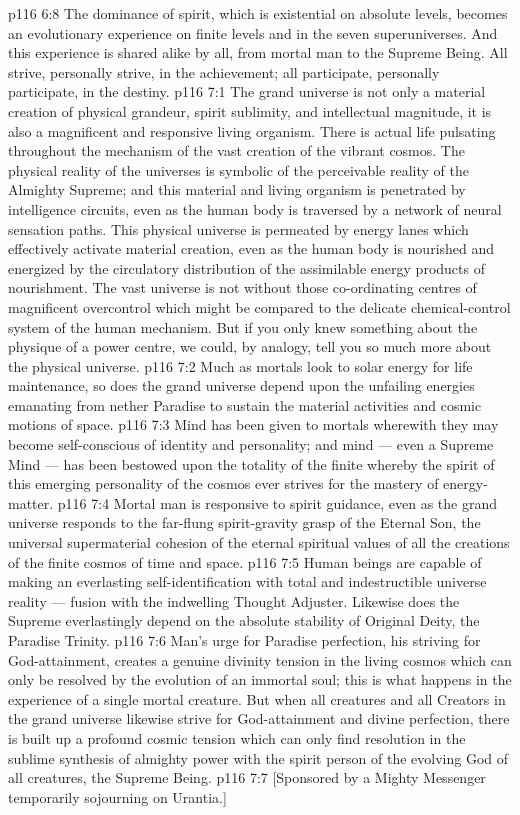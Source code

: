 \vs p116 6:8 The dominance of spirit, which is existential on absolute levels, becomes an evolutionary experience on finite levels and in the seven superuniverses. And this experience is shared alike by all, from mortal man to the Supreme Being. All strive, personally strive, in the achievement; all participate, personally participate, in the destiny.
\vs p116 7:1 The grand universe is not only a material creation of physical grandeur, spirit sublimity, and intellectual magnitude, it is also a magnificent and responsive living organism. There is actual life pulsating throughout the mechanism of the vast creation of the vibrant cosmos. The physical reality of the universes is symbolic of the perceivable reality of the Almighty Supreme; and this material and living organism is penetrated by intelligence circuits, even as the human body is traversed by a network of neural sensation paths. This physical universe is permeated by energy lanes which effectively activate material creation, even as the human body is nourished and energized by the circulatory distribution of the assimilable energy products of nourishment. The vast universe is not without those co\hyp{}ordinating centres of magnificent overcontrol which might be compared to the delicate chemical\hyp{}control system of the human mechanism. But if you only knew something about the physique of a power centre, we could, by analogy, tell you so much more about the physical universe.
\vs p116 7:2 Much as mortals look to solar energy for life maintenance, so does the grand universe depend upon the unfailing energies emanating from nether Paradise to sustain the material activities and cosmic motions of space.
\vs p116 7:3 Mind has been given to mortals wherewith they may become self\hyp{}conscious of identity and personality; and mind --- even a Supreme Mind --- has been bestowed upon the totality of the finite whereby the spirit of this emerging personality of the cosmos ever strives for the mastery of energy\hyp{}matter.
\vs p116 7:4 Mortal man is responsive to spirit guidance, even as the grand universe responds to the far\hyp{}flung spirit\hyp{}gravity grasp of the Eternal Son, the universal supermaterial cohesion of the eternal spiritual values of all the creations of the finite cosmos of time and space.
\vs p116 7:5 Human beings are capable of making an everlasting self\hyp{}identification with total and indestructible universe reality --- fusion with the indwelling Thought Adjuster. Likewise does the Supreme everlastingly depend on the absolute stability of Original Deity, the Paradise Trinity.
\vs p116 7:6 Man’s urge for Paradise perfection, his striving for God\hyp{}attainment, creates a genuine divinity tension in the living cosmos which can only be resolved by the evolution of an immortal soul; this is what happens in the experience of a single mortal creature. But when all creatures and all Creators in the grand universe likewise strive for God\hyp{}attainment and divine perfection, there is built up a profound cosmic tension which can only find resolution in the sublime synthesis of almighty power with the spirit person of the evolving God of all creatures, the Supreme Being.
\vsetoff
\vs p116 7:7 [Sponsored by a Mighty Messenger temporarily sojourning on Urantia.]

